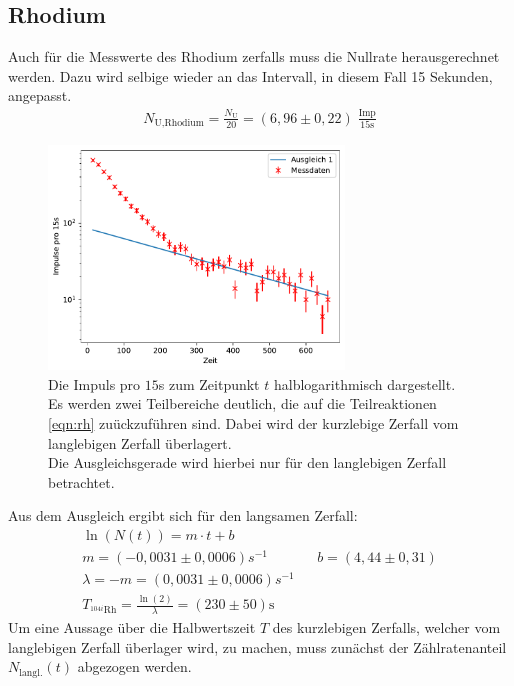 \subsection{Rhodium}
Auch für die Messwerte des Rhodium zerfalls muss die Nullrate herausgerechnet werden.
Dazu wird selbige wieder an das Intervall, in diesem Fall 15 Sekunden, angepasst.
\begin{align*}
    N_{\text{U},\text{Rhodium}} =  \frac{N_{\text{U}}}{20} = (6,96 \pm 0,22) \; \frac{\text{Imp}}{15\text{s}}
\end{align*}
\begin{figure}
    \centering
    \includegraphics[width=0.7\textwidth]{plots/Rhodium_lang.pdf}
    \caption{Die Impuls pro $15$s zum Zeitpunkt $t$ halblogarithmisch dargestellt.\\
    Es werden zwei Teilbereiche deutlich, die auf die Teilreaktionen \ref{eqn:rh} zuückzuführen sind.
    Dabei wird der kurzlebige Zerfall vom langlebigen Zerfall überlagert.\\
    Die Ausgleichsgerade wird hierbei nur für den langlebigen Zerfall betrachtet.}
    \label{fig:langlebigRH}
\end{figure}
Aus dem Ausgleich ergibt sich für den langsamen Zerfall:
\begin{align*}
    \ln(N(t)) = m \cdot t + b\\
     m = (-0,0031 \pm 0,0006)\si{s^{-1}} && b = (4,44 \pm 0,31) \\
    \lambda = -m = (0,0031 \pm 0,0006)\si{s^{-1}} \\
    T_{^{104i}\text{Rh}} = \frac{\ln(2)}{\lambda} =  (230 \pm 50) \text{s}
\end{align*}
Um eine Aussage über die Halbwertszeit $T$ des kurzlebigen Zerfalls, welcher vom langlebigen Zerfall
überlager wird, zu machen, muss zunächst der Zählratenanteil $N_{\text{langl.}}(t)$ abgezogen werden.
